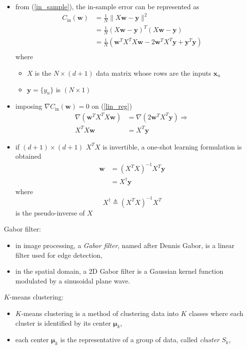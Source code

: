 \documentclass[onecolumn]{IEEEtran}
\newcommand{\beq}{\begin{equation}}
\newcommand{\eeq}{\end{equation}}
\newcommand{\bi}{\begin{itemize}}
\newcommand{\ei}{\end{itemize}}
\begin{document}
\begin{itemize}
        \item from (\ref{in_sample}), the in-sample error can be represented as
        \beq\label{lin_reg}\begin{split}
            C_\text{in}(\bm{w}) &= \frac{1}{N} \|X\bm{w}-\bm{y}\|^2\\
            &=  \frac{1}{N}(X\bm{w}-\bm{y})^T (X\bm{w}-\bm{y})\\
            &= \frac{1}{N}(\bm{w}^TX^TX\bm{w} -2\bm{w}^TX^T\bm{y} +\bm{y}^T \bm{y})\\
        \end{split}\eeq
        where
        \bi
            \item $X$ is the $N \times (d+1)$ data matrix whose rows are the inputs $\bm{x}_n$
            \item  $\bm{y}= \{y_n\}$ is $(N \times 1)$
        \ei
        \item imposing $\nabla C_\text{in}(\bm{w})=0$ on (\ref{lin_reg})
        \beq\label{lin_reg_b}\begin{split}
             \nabla (\bm{w}^TX^TX\bm{w}) &= \nabla(2\bm{w}^TX^T\bm{y})\Rightarrow\\
           X^TX \bm{w} &=  X^T\bm{y}
        \end{split}\eeq
        \item if $(d+1) \times (d+1)$ $X^TX$ is invertible, a one-shot learning formulation is obtained
        \beq\label{pseudo_inv}\begin{split}
            \bm{w} &= (X^TX)^{-1}X^T\bm{y}\\
            &= X^\dag \bm{y}
        \end{split}\eeq
        where
        \beq
            X^\dag \triangleq (X^TX)^{-1}X^T
        \eeq
        is the pseudo-inverse of $X$
    \ei
    \item Gabor filter:
    \bi
        \item in image processing, a \emph{Gabor filter}, named after Dennis Gabor, is a linear filter used for edge detection,
        \item in the spatial domain, a 2D Gabor filter is a Gaussian kernel function modulated by a sinusoidal plane wave.
    \ei
      \item $K$-means clustering:
    \bi
        \item $K$-means clustering is a method of clustering data into $K$ classes where each cluster is identified by its center  $\bm{\mu}_k$,
        \item each center $\bm{\mu}_k$ is the representative of a group of data, called \emph{cluster} $S_k$,

\end{itemize}
\end{document}
